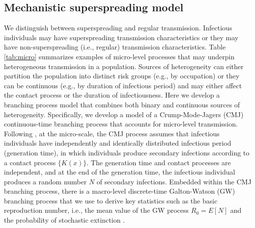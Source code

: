 \documentclass{imammb}
\numberwithin{equation}{section}
\begin{document}

\subsection{Mechanistic superspreading model}


 
We distinguish between superspreading and regular transmission.  Infectious individuals may have superspreading transmission characteristics or they may have non-superspreading (i.e., regular) transmission characteristics. Table \ref{tab:micro} summarizes examples of micro-level processes that may underpin heterogeneous transmission in a population. Sources of heterogeneity can either partition the population into distinct risk groups (e.g., by occupation) or they can be continuous (e.g., by duration of infectious period) and may either affect the contact process or the duration of infectiousness. Here we develop a branching process model that combines both binary and continuous sources of heterogeneity. Specifically, we develop a model of a Crump-Mode-Jagers (CMJ) continuous-time branching process that accounts for micro-level transmission. Following \citet{Yan2008-jc}, at the micro-scale, the CMJ process assumes that infectious individuals have independently and identically distributed infectious period (generation time), in which individuals produce secondary infections according to a contact process $\{K(x)\}$. The generation time and contact processes are independent, and at the end of the generation time, the infectious individual produces a random number $N$ of secondary infections. Embedded within the CMJ branching process, there is a macro-level discrete-time Galton-Watson (GW) branching process that we use to derive key statistics such as the basic reproduction number, i.e., the mean value of the GW process $R_0=E[N]$ and the probability of stochastic extinction \citep{Mode2000-hp, Yan2008-jc}.



\end{document}
